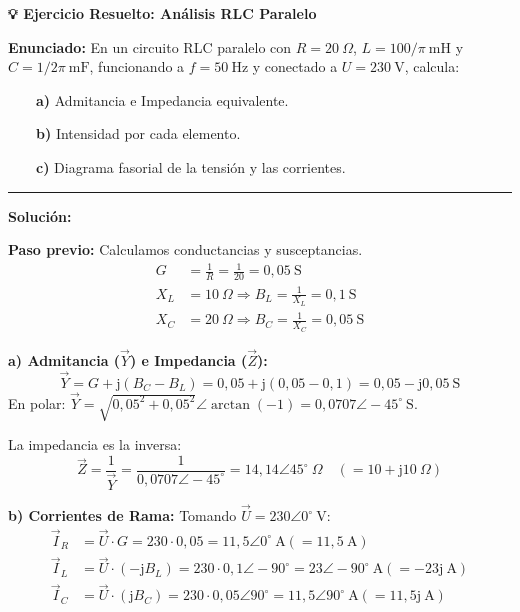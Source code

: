 \documentclass[
  a4paper,
  DIV=11,
  numbers=noendperiod]{scrreprt}
\begin{document}
\begin{tcolorbox}[enhanced jigsaw, breakable, colback=white, left=2mm, leftrule=.75mm, rightrule=.15mm, toprule=.15mm, colframe=quarto-callout-important-color-frame, arc=.35mm, bottomrule=.15mm, opacityback=0]

\vspace{-3mm}\textbf{💡 Ejercicio Resuelto: Análisis RLC Paralelo}\vspace{3mm}

\textbf{Enunciado:} En un circuito RLC paralelo con \(R=20\ \Omega\),
\(L=100/\pi\ \text{mH}\) y \(C=1/2\pi\ \text{mF}\), funcionando a
\(f=50\ \text{Hz}\) y conectado a \(U=230\ \text{V}\), calcula:\\
\strut ~~~~\textbf{a)} Admitancia e Impedancia equivalente.\\
\strut ~~~~\textbf{b)} Intensidad por cada elemento.\\
\strut ~~~~\textbf{c)} Diagrama fasorial de la tensión y las
corrientes.\\

\begin{center}\rule{0.5\linewidth}{0.5pt}\end{center}

\textbf{Solución:}

\textbf{Paso previo:} Calculamos conductancias y susceptancias. \[
\begin{aligned}
G &= \frac{1}{R} = \frac{1}{20} = 0,05\ \text{S} \\
X_L &= 10\ \Omega \Rightarrow B_L = \frac{1}{X_L} = 0,1\ \text{S} \\
X_C &= 20\ \Omega \Rightarrow B_C = \frac{1}{X_C} = 0,05\ \text{S}
\end{aligned}
\]

\textbf{a) Admitancia (\(\vec{Y}\)) e Impedancia (\(\vec{Z}\)):} \[
\vec{Y} = G + \mathrm{j}(B_C - B_L) = 0,05 + \mathrm{j}(0,05 - 0,1) = 0,05 - \mathrm{j}0,05\ \text{S}
\] En polar:
\(\vec{Y} = \sqrt{0,05^2 + 0,05^2} \angle \arctan(-1) = 0,0707 \angle -45^\circ\ \text{S}\).

La impedancia es la inversa: \[
\vec{Z} = \frac{1}{\vec{Y}} = \frac{1}{0,0707 \angle -45^\circ} = 14,14 \angle 45^\circ\ \Omega \quad (= 10 + \mathrm{j}10\ \Omega)
\]

\textbf{b) Corrientes de Rama:} Tomando
\(\vec{U} = 230 \angle 0^\circ\ \text{V}\): \[
\begin{aligned}
\vec{I}_R &= \vec{U} \cdot G = 230 \cdot 0,05 = 11,5 \angle 0^\circ\ \text{A} (=11,5\ \text{A}) \\
\vec{I}_L &= \vec{U} \cdot (-\mathrm{j}B_L) = 230 \cdot 0,1 \angle -90^\circ = 23 \angle -90^\circ\ \text{A} (=-23\mathrm{j}\ \text{A}) \\
\vec{I}_C &= \vec{U} \cdot (\mathrm{j}B_C) = 230 \cdot 0,05 \angle 90^\circ = 11,5 \angle 90^\circ\ \text{A} (=11,5\mathrm{j}\ \text{A})
\end{aligned}
\]


\end{tcolorbox}
\end{document}
